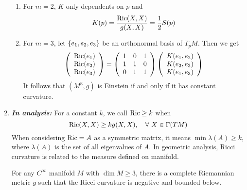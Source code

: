\begin{enumerate}[label=\arabic{*}.]
	\begin{rmk}
		\begin{enumerate}[label=(\roman{*})]
			\item For $m=2$, $K$ only dependents on $p$ and 
			\begin{equation*}
				K(p) = \frac{\operatorname{Ric}(X,X)}{g(X,X)} = \frac{1}{2}S(p)
			\end{equation*}
			\item For $m=3$, let $\left\{e_1,e_2,e_3\right\}$ be an orthonormal basis of $T_pM$. Then we get
			\begin{equation*}
				\left(
					\begin{array}{c}
						\operatorname{Ric}(e_1)\\
						\operatorname{Ric}(e_2)\\
						\operatorname{Ric}(e_3)
					\end{array}
				\right) = \left(
					\begin{array}{ccc}
						1 & 0 & 1\\
						1 & 1 & 0 \\
						0 & 1 & 1
					\end{array}
				\right)\left(
					\begin{array}{c}
						K(e_1,e_2)\\
						K(e_2,e_3)\\
						K(e_1,e_3)
					\end{array}
				\right)
			\end{equation*}
			It follows that $(M^3,g)$ is Einstein if and only if it has constant curvature.
		\end{enumerate}
	\end{rmk}

	\item \emph{\textbf{In analysis:}} For a constant $k$, we call $\operatorname{Ric} \geq k$ when
	\begin{equation*}
		\operatorname{Ric}(X,X) \geq kg(X,X),\quad \forall~ X \in \Gamma(TM)
	\end{equation*}
	When considering $\operatorname{Ric} = A$ as a symmetric matrix, it means $\min \lambda(A) \geq k$, where $\lambda(A)$ is the set of all eigenvalues of $A$. In geometric analysis, Ricci curvature is related to the measure defined on manifold.

	\begin{thm}
		For any $C^\infty$ manifold $M$ with $\dim M \geq 3$, there is a complete Riemannian metric $g$ such that the Ricci curvature is negative and bounded below.
	\end{thm}


\end{enumerate}
